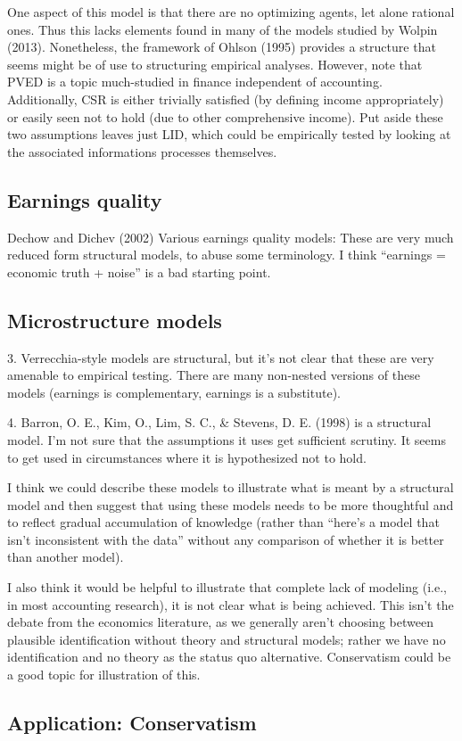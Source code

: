 One aspect of this model is that there are no optimizing agents, let alone rational ones. Thus this lacks elements found in many of the models studied by Wolpin (2013). Nonetheless, the framework of Ohlson (1995) provides a structure that seems might be of use to structuring empirical analyses. However, note that PVED is a topic much-studied in finance independent of accounting. Additionally, CSR is either trivially satisfied (by defining income appropriately) or easily seen not to hold (due to other comprehensive income). Put aside these two assumptions leaves just LID, which could be empirically tested by looking at the associated informations processes themselves.

\citep{Dechow:1998}

\subsection{Earnings quality}

\citet{Dechow:1998}

Dechow and Dichev (2002) Various earnings quality models: These are very much reduced form structural models, to abuse some terminology. I think “earnings = economic truth + noise” is a bad starting point.

\subsection{Microstructure models}

3. Verrecchia-style models are structural, but it’s not clear that these are very amenable to empirical testing. There are many non-nested versions of these models (earnings is complementary, earnings is a substitute).

4. Barron, O. E., Kim, O., Lim, S. C., \& Stevens, D. E. (1998) is a structural model. I’m not sure that the assumptions it uses get sufficient scrutiny. It seems to get used in circumstances where it is hypothesized not to hold.

I think we could describe these models to illustrate what is meant by a structural model and then suggest that using these models needs to be more thoughtful and to reflect gradual accumulation of knowledge (rather than “here’s a model that isn’t inconsistent with the data” without any comparison of whether it is better than another model).

I also think it would be helpful to illustrate that complete lack of modeling (i.e., in most accounting research), it is not clear what is being achieved. This isn’t the debate from the economics literature, as we generally aren’t choosing between plausible identification without theory and structural models; rather we have no identification and no theory as the status quo alternative. Conservatism could be a good topic for illustration of this.

\subsection{Application: Conservatism}
